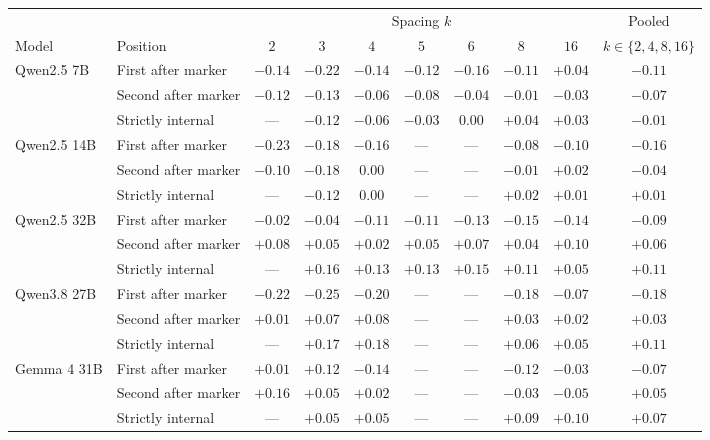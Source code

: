 \begin{tabular}{ll cccccccc}
\toprule
& & \multicolumn{7}{c}{Spacing $k$} & Pooled \\
\cmidrule(lr){3-9}
Model & Position & $2$ & $3$ & $4$ & $5$ & $6$ & $8$ & $16$ & $k \in \{2,4,8,16\}$ \\
\midrule
Qwen2.5 7B & First after marker & $-0.14$ & $-0.22$ & $-0.14$ & $-0.12$ & $-0.16$ & $-0.11$ & $+0.04$ & $\mathbf{-0.11}$ \\
 & Second after marker & $-0.12$ & $-0.13$ & $-0.06$ & $-0.08$ & $-0.04$ & $-0.01$ & $-0.03$ & $-0.07$ \\
 & Strictly internal & --- & $-0.12$ & $-0.06$ & $-0.03$ & $0.00$ & $+0.04$ & $+0.03$ & $-0.01$ \\
\midrule
Qwen2.5 14B & First after marker & $-0.23$ & $-0.18$ & $-0.16$ & --- & --- & $-0.08$ & $-0.10$ & $\mathbf{-0.16}$ \\
 & Second after marker & $-0.10$ & $-0.18$ & $0.00$ & --- & --- & $-0.01$ & $+0.02$ & $-0.04$ \\
 & Strictly internal & --- & $-0.12$ & $0.00$ & --- & --- & $+0.02$ & $+0.01$ & $+0.01$ \\
\midrule
Qwen2.5 32B & First after marker & $-0.02$ & $-0.04$ & $-0.11$ & $-0.11$ & $-0.13$ & $-0.15$ & $-0.14$ & $-0.09$ \\
 & Second after marker & $+0.08$ & $+0.05$ & $+0.02$ & $+0.05$ & $+0.07$ & $+0.04$ & $+0.10$ & $+0.06$ \\
 & Strictly internal & --- & $+0.16$ & $+0.13$ & $+0.13$ & $+0.15$ & $+0.11$ & $+0.05$ & $+0.11$ \\
\midrule
Qwen3.8 27B & First after marker & $-0.22$ & $-0.25$ & $-0.20$ & --- & --- & $-0.18$ & $-0.07$ & $\mathbf{-0.18}$ \\
 & Second after marker & $+0.01$ & $+0.07$ & $+0.08$ & --- & --- & $+0.03$ & $+0.02$ & $+0.03$ \\
 & Strictly internal & --- & $+0.17$ & $+0.18$ & --- & --- & $+0.06$ & $+0.05$ & $+0.11$ \\
\midrule
Gemma 4 31B & First after marker & $+0.01$ & $+0.12$ & $-0.14$ & --- & --- & $-0.12$ & $-0.03$ & $-0.07$ \\
 & Second after marker & $+0.16$ & $+0.05$ & $+0.02$ & --- & --- & $-0.03$ & $-0.05$ & $+0.05$ \\
 & Strictly internal & --- & $+0.05$ & $+0.05$ & --- & --- & $+0.09$ & $+0.10$ & $+0.07$ \\
\bottomrule
\end{tabular}
